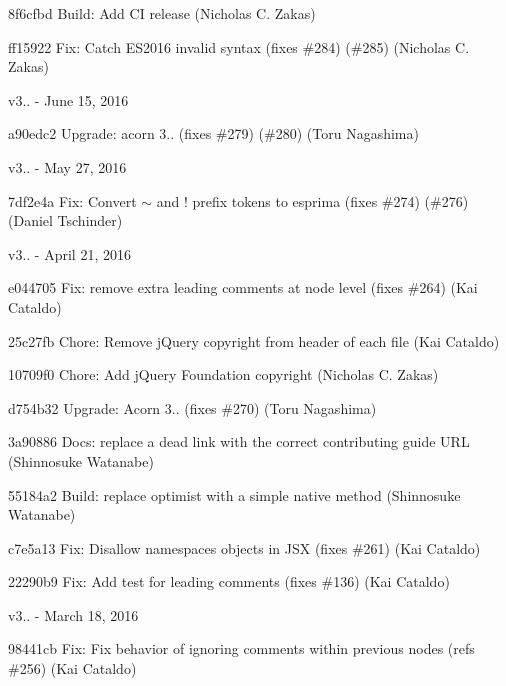 \begin{DoxyItemize}
\item 8f6cfbd Build\+: Add CI release (Nicholas C. Zakas)
\item ff15922 Fix\+: Catch E\+S2016 invalid syntax (fixes \#284) (\#285) (Nicholas C. Zakas)
\end{DoxyItemize}

v3.. -\/ June 15, 2016


\begin{DoxyItemize}
\item a90edc2 Upgrade\+: acorn 3.. (fixes \#279) (\#280) (Toru Nagashima)
\end{DoxyItemize}

v3.. -\/ May 27, 2016


\begin{DoxyItemize}
\item 7df2e4a Fix\+: Convert $\sim$ and ! prefix tokens to esprima (fixes \#274) (\#276) (Daniel Tschinder)
\end{DoxyItemize}

v3.. -\/ April 21, 2016


\begin{DoxyItemize}
\item e044705 Fix\+: remove extra leading comments at node level (fixes \#264) (Kai Cataldo)
\item 25c27fb Chore\+: Remove j\+Query copyright from header of each file (Kai Cataldo)
\item 10709f0 Chore\+: Add j\+Query Foundation copyright (Nicholas C. Zakas)
\item d754b32 Upgrade\+: Acorn 3.. (fixes \#270) (Toru Nagashima)
\item 3a90886 Docs\+: replace a dead link with the correct contributing guide U\+RL (Shinnosuke Watanabe)
\item 55184a2 Build\+: replace optimist with a simple native method (Shinnosuke Watanabe)
\item c7e5a13 Fix\+: Disallow namespaces objects in J\+SX (fixes \#261) (Kai Cataldo)
\item 22290b9 Fix\+: Add test for leading comments (fixes \#136) (Kai Cataldo)
\end{DoxyItemize}

v3.. -\/ March 18, 2016


\begin{DoxyItemize}
\item 98441cb Fix\+: Fix behavior of ignoring comments within previous nodes (refs \#256) (Kai Cataldo)
\end{DoxyItemize}

